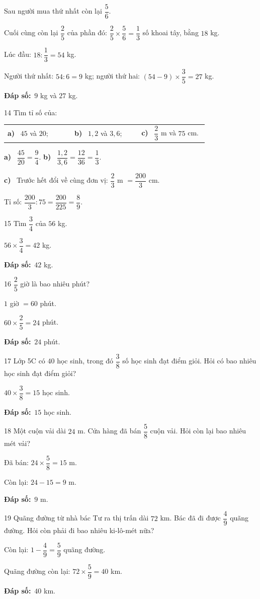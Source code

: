 \documentclass[11pt]{article}
\makeatletter
\newif\ifsol \solfalse
\renewcommand{\arraystretch}{1.35}
\providecommand{\AnsWord}{Đáp số}
\newcommand{\dapso}[1]{\par\textbf{\AnsWord:}\ #1}
\newcommand{\probsol}[1]{%
  \begin{lrbox}{\solmeasure}\begin{minipage}{\dimexpr\linewidth-24pt\relax}#1\end{minipage}\end{lrbox}%
  \ifsol
    \begin{solbox}#1\end{solbox}%
  \else
    \setlength{\solht}{\dimexpr\ht\solmeasure+\dp\solmeasure+0.85cm\relax}%
    \ifdim\solht<1.35cm\setlength{\solht}{1.35cm}\fi
    \begin{tcolorbox}[colback=white,colframe=Line,boxrule=0.8pt,arc=5pt,
      left=8pt,right=8pt,top=4pt,bottom=4pt,height=\solht]{\footnotesize\color{Slate}\itshape\WorkWord}\end{tcolorbox}%
  \fi}
\newcommand{\pa}[1]{\textbf{#1)}\ }
\newenvironment{cols3}{\par\vspace{3pt}\noindent\setlength{\tabcolsep}{0pt}\renewcommand{\arraystretch}{1.3}%
  \begin{tabular}{@{}>{\raggedright\arraybackslash\rule{0pt}{4.4ex}}p{0.32\linewidth}<{\rule[-2.3ex]{0pt}{0pt}}@{\hspace{0.015\linewidth}}>{\raggedright\arraybackslash\rule{0pt}{4.4ex}}p{0.32\linewidth}<{\rule[-2.3ex]{0pt}{0pt}}@{\hspace{0.015\linewidth}}>{\raggedright\arraybackslash\rule{0pt}{4.4ex}}p{0.32\linewidth}<{\rule[-2.3ex]{0pt}{0pt}}@{}}}%
  {\end{tabular}\par}
\newcommand{\gap}{\vspace{0.3cm}}
\def\WorkWord{Bài làm:}
\def\AnsWord{Đáp số}
\makeatother
\begin{document}
\probsol{
Sau người mua thứ nhất còn lại $\dfrac56$.\par Cuối cùng còn lại $\dfrac25$ của phần đó: $\dfrac25\times\dfrac56=\dfrac13$ số khoai tây, bằng $18$ kg.\par
Lúc đầu: $18:\dfrac13=54$ kg.\par Người thứ nhất: $54:6=9$ kg; người thứ hai: $(54-9)\times\dfrac35=27$ kg.
\dapso{$9$ kg và $27$ kg.}}
\gap
\begin{probbox}{14}{\relax}
Tìm tỉ số của:
\begin{cols3}
\pa{a} $45$ và $20$; & \pa{b} $1{,}2$ và $3{,}6$; & \pa{c} $\dfrac23$ m và $75$ cm.
\end{cols3}
\end{probbox}
\probsol{
\pa{a} $\dfrac{45}{20}=\dfrac94$. \qquad \pa{b} $\dfrac{1{,}2}{3{,}6}=\dfrac{12}{36}=\dfrac13$.\par
\pa{c} Trước hết đổi về cùng đơn vị: $\dfrac23$ m $=\dfrac{200}3$ cm.\par Tỉ số: $\dfrac{200}3:75=\dfrac{200}{225}=\dfrac89$.
}
\gap
\begin{probbox}{15}{\relax}
Tìm $\dfrac34$ của $56$ kg.
\end{probbox}
\probsol{
$56\times\dfrac34=42$ kg.
\dapso{$42$ kg.}}
\gap
\begin{probbox}{16}{\relax}
$\dfrac25$ giờ là bao nhiêu phút?
\end{probbox}
\probsol{
$1$ giờ $=60$ phút.\par $60\times\dfrac25=24$ phút.
\dapso{$24$ phút.}}
\gap
\begin{probbox}{17}{\relax}
Lớp 5C có $40$ học sinh, trong đó $\dfrac38$ số học sinh đạt điểm giỏi. Hỏi có bao nhiêu học sinh đạt điểm giỏi?
\end{probbox}
\probsol{
$40\times\dfrac38=15$ học sinh.
\dapso{$15$ học sinh.}}
\gap
\begin{probbox}{18}{\relax}
Một cuộn vải dài $24$ m. Cửa hàng đã bán $\dfrac58$ cuộn vải. Hỏi còn lại bao nhiêu mét vải?
\end{probbox}
\probsol{
Đã bán: $24\times\dfrac58=15$ m.\par Còn lại: $24-15=9$ m.
\dapso{$9$ m.}}
\gap
\begin{probbox}{19}{\relax}
Quãng đường từ nhà bác Tư ra thị trấn dài $72$ km. Bác đã đi được $\dfrac49$ quãng đường. Hỏi còn phải đi bao nhiêu ki-lô-mét nữa?
\end{probbox}
\probsol{
Còn lại: $1-\dfrac49=\dfrac59$ quãng đường.\par Quãng đường còn lại: $72\times\dfrac59=40$ km.
\dapso{$40$ km.}}
\end{document}
